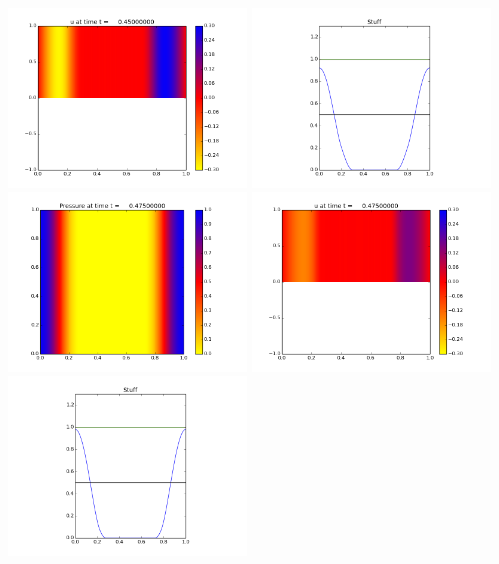 \documentclass[11pt]{article}
\begin{document}
\includegraphics[width=0.475\textwidth]{frame0018fig1.png}
\vskip 10pt 
\includegraphics[width=0.475\textwidth]{frame0018fig3.png}
\vskip 10pt 
\includegraphics[width=0.475\textwidth]{frame0019fig0.png}
\includegraphics[width=0.475\textwidth]{frame0019fig1.png}
\vskip 10pt 
\includegraphics[width=0.475\textwidth]{frame0019fig3.png}
\end{document}
